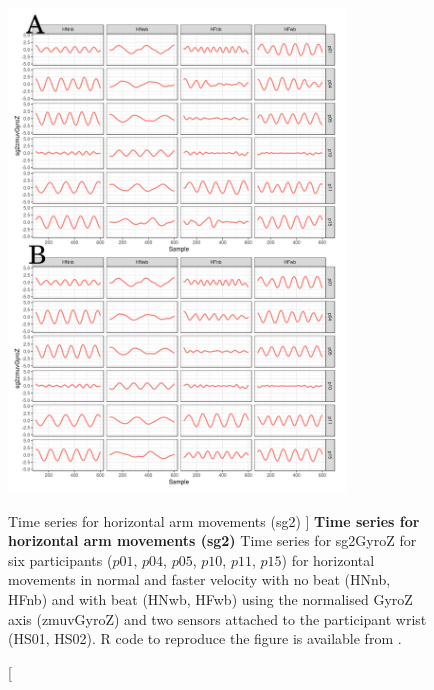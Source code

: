 \begin{figure}
\centering
\includegraphics[width=0.8\textwidth]{tssg2gyroZ}
    	\caption
	[Time series for horizontal arm movements (sg2) ]{
	{\bf Time series for horizontal arm movements (sg2)}
		Time series for sg2GyroZ for six participants 
		($p01$, $p04$, $p05$, $p10$, $p11$, $p15$) 
		for horizontal movements in normal and faster velocity with
		no beat	(HNnb, HFnb) and with beat (HNwb, HFwb) using 
		the normalised GyroZ axis (zmuvGyroZ) and 
		two sensors attached to the participant wrist (HS01, HS02).
	R code to reproduce the figure is available from \cite{hwum2018}.
        }
    \label{fig:tssg2gyroZ-hii}
\end{figure}




